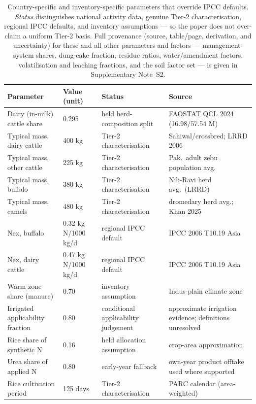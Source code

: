 \begin{table}[!htbp]
\centering
\footnotesize
\begin{tabular}{@{}llll@{}}
\toprule
\textbf{Parameter} & \textbf{Value (unit)} & \textbf{Status} & \textbf{Source} \\
\midrule
Dairy (in-milk) cattle share & 0.295 & held herd-composition split & FAOSTAT QCL 2024 (16.98/57.54 M) \\
Typical mass, dairy cattle & 400 kg & Tier-2 characterisation & Sahiwal/crossbred; LRRD 2006 \\
Typical mass, other cattle & 225 kg & Tier-2 characterisation & Pak.\ adult zebu population avg. \\
Typical mass, buffalo & 380 kg & Tier-2 characterisation & Nili-Ravi herd avg.\ (LRRD) \\
Typical mass, camels  & 480 kg & Tier-2 characterisation & dromedary herd avg.; Khan 2025 \\
Nex, buffalo & 0.32 kg N/1000\,kg/d & regional IPCC default & IPCC 2006 T10.19 Asia \\
Nex, dairy cattle & 0.47 kg N/1000\,kg/d & regional IPCC default & IPCC 2006 T10.19 Asia \\
Warm-zone share (manure) & 0.70 & inventory assumption & Indus-plain climate zone \\
Irrigated applicability fraction & 0.80 & conditional applicability judgement & approximate irrigation evidence; definitions unresolved \\
Rice share of synthetic N & 0.16 & held allocation assumption & crop-area approximation \\
Urea share of applied N & 0.80 & early-year fallback & own-year product offtake used where supported \\
Rice cultivation period & 125 days & Tier-2 characterisation & PARC calendar (area-weighted) \\
\bottomrule
\end{tabular}
\caption{Country-specific and inventory-specific parameters that override IPCC
defaults. \emph{Status} distinguishes national activity data, genuine Tier-2
characterisation, regional IPCC defaults, and inventory assumptions --- so the
paper does not over-claim a uniform Tier-2 basis. Full provenance (source,
table/page, derivation, and uncertainty) for these and all other
parameters and factors --- management-system shares, dung-cake fraction, residue
ratios, water/amendment factors, volatilisation and leaching fractions, and the
soil \NtwoO{} factor set --- is given in Supplementary Note~S2.}
\label{tab:tier2}
\end{table}


